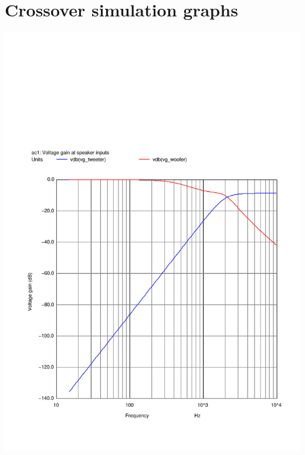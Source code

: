 \documentclass[10pt]{article}
\begin{document}
\pagebreak
\null
\vfil
\centering\section{Crossover simulation graphs}
\vfil
\pagebreak
\begin{multicols}{2}
	\includegraphics[scale=0.35,page=1]{../crossover/ngspice/gain.pdf}

\end{multicols}
\end{document}
